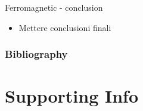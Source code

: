 \documentclass{beamer}
\begin{document}
\begin{frame}{Ferromagnetic - conclusion}
\begin{itemize}
\item Mettere conclusioni finali
\end{itemize}
\end{frame}



\begin{frame}[t,allowframebreaks]
\frametitle{Bibliography}
\printbibliography
\end{frame}



\section{Supporting Info}
\end{document}
